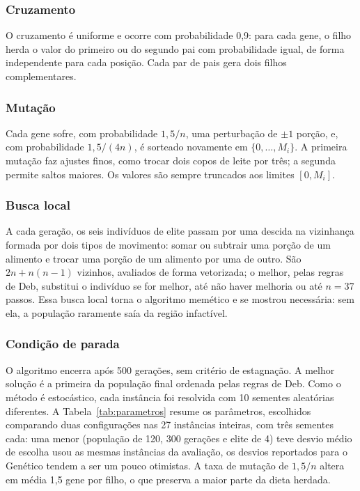 \documentclass[12pt]{article}
\begin{document}
\subsubsection{Cruzamento}

O cruzamento é uniforme e ocorre com probabilidade 0,9: para cada gene, o filho herda o
valor do primeiro ou do segundo pai com probabilidade igual, de forma independente para
cada posição. Cada par de pais gera dois filhos complementares.

\subsubsection{Mutação}

Cada gene sofre, com probabilidade $1{,}5/n$, uma perturbação de $\pm 1$ porção, e,
com probabilidade $1{,}5/(4n)$, é sorteado novamente em $\{0, \dots, M_i\}$. A primeira
mutação faz ajustes finos, como trocar dois copos de leite por três; a segunda permite
saltos maiores. Os valores são sempre truncados aos limites $[0, M_i]$.

\subsubsection{Busca local}

A cada geração, os seis indivíduos de elite passam por uma descida na vizinhança
formada por dois tipos de movimento: somar ou subtrair uma porção de um alimento e
trocar uma porção de um alimento por uma de outro. São $2n + n(n-1)$ vizinhos, avaliados de forma
vetorizada; o melhor, pelas regras de Deb, substitui o indivíduo se for melhor, até não
haver melhoria ou até $n = 37$ passos. Essa busca local torna o algoritmo memético e se
mostrou necessária: sem ela, a população raramente saía da região infactível.

\subsubsection{Condição de parada}

O algoritmo encerra após 500 gerações, sem critério de estagnação. A melhor solução
é a primeira da população final ordenada pelas regras de Deb. Como o método é
estocástico, cada instância foi resolvida com 10 sementes aleatórias diferentes. A
Tabela~\ref{tab:parametros} resume os parâmetros, escolhidos comparando duas configurações nas 27 instâncias inteiras, com três
sementes cada: uma menor (população de 120, 300 gerações e elite de 4) teve desvio médio
de %
escolha usou as mesmas instâncias da avaliação, os desvios reportados para o Genético
tendem a ser um pouco otimistas. A taxa de mutação de $1{,}5/n$ altera em média 1,5 gene por
filho, o que
preserva a maior parte da dieta herdada.
\end{document}
